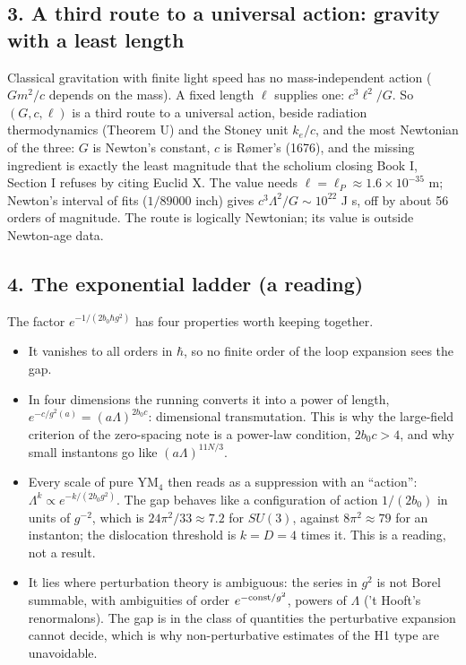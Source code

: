 \documentclass[11pt,a4paper]{article}
\newcommand{\tightlist}{\setlength{\itemsep}{0pt}\setlength{\parskip}{0pt}}
\begin{document}
\hypertarget{a-third-route-to-a-universal-action-gravity-with-a-least-length}{%
\subsection{3. A third route to a universal action: gravity with a least
length}\label{a-third-route-to-a-universal-action-gravity-with-a-least-length}}

Classical gravitation with finite light speed has no mass-independent
action (\(Gm^2/c\) depends on the mass). A fixed length \(\ell\)
supplies one: \(c^3\ell^2/G\). So \((G,c,\ell)\) is a third route to a
universal action, beside radiation thermodynamics (Theorem U) and the
Stoney unit \(k_e/c\), and the most Newtonian of the three: \(G\) is
Newton's constant, \(c\) is Rømer's (1676), and the missing ingredient
is exactly the least magnitude that the scholium closing Book I, Section
I refuses by citing Euclid X. The value needs
\(\ell=\ell_P\approx1.6\times10^{-35}\) m; Newton's interval of fits
(\(1/89000\) inch) gives \(c^3\Lambda^2/G\sim10^{22}\) J s, off by about
56 orders of magnitude. The route is logically Newtonian; its value is
outside Newton-age data.

\hypertarget{the-exponential-ladder-a-reading}{%
\subsection{4. The exponential ladder (a
reading)}\label{the-exponential-ladder-a-reading}}

The factor \(e^{-1/(2b_0\hbar g^2)}\) has four properties worth keeping
together.

\begin{itemize}
\tightlist
\item
  It vanishes to all orders in \(\hbar\), so no finite order of the loop
  expansion sees the gap.
\item
  In four dimensions the running converts it into a power of length,
  \(e^{-c/g^2(a)}=(a\Lambda)^{2b_0c}\): dimensional transmutation. This
  is why the large-field criterion of the zero-spacing note is a
  power-law condition, \(2b_0c>4\), and why small instantons go like
  \((a\Lambda)^{11N/3}\).
\item
  Every scale of pure YM\(_4\) then reads as a suppression with an
  ``action'': \(\Lambda^k\propto e^{-k/(2b_0g^2)}\). The gap behaves
  like a configuration of action \(1/(2b_0)\) in units of \(g^{-2}\),
  which is \(24\pi^2/33\approx7.2\) for \(SU(3)\), against
  \(8\pi^2\approx79\) for an instanton; the dislocation threshold is
  \(k=D=4\) times it. This is a reading, not a result.
\item
  It lies where perturbation theory is ambiguous: the series in \(g^2\)
  is not Borel summable, with ambiguities of order
  \(e^{-{\rm const}/g^2}\), powers of \(\Lambda\) ('t Hooft's
  renormalons). The gap is in the class of quantities the perturbative
  expansion cannot decide, which is why non-perturbative estimates of
  the H1 type are unavoidable.
\end{itemize}
\end{document}
